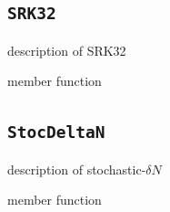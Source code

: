 \documentclass[aps, prd
, preprint
, nofootinbib 
, notitlepage
, superscriptaddress
, longbibliography
]{revtex4-1}
\begin{document}
\subsection{\texttt{SRK32}}

description of SRK32

member function


\subsection{\texttt{StocDeltaN}}\label{sec: StocDeltaN}

description of stochastic-$\delta N$

member function
















\end{document}
